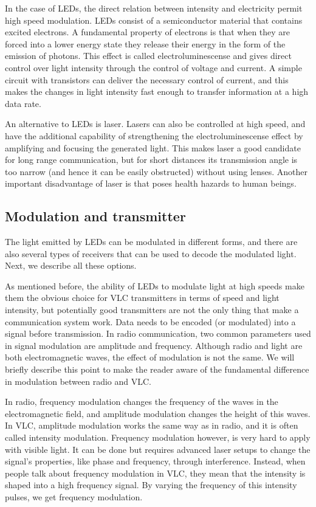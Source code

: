 In the case of LEDs, the direct relation between intensity and electricity permit
high speed modulation. LEDs consist of a semiconductor material that contains
excited electrons. A fundamental property of electrons is that when they are
forced into a lower energy state they release their energy in the form of the emission
of photons. This effect is called electroluminescense and gives direct control
over light intensity through the control of voltage and current. A simple circuit
with transistors can deliver the necessary control of current, and this makes the
changes in light intensity fast enough to transfer information at a high data rate.

An alternative to LEDs is laser. Lasers can also be controlled at high speed, and
have the additional capability of strengthening the electroluminescense effect by
amplifying and focusing the generated light. This makes laser a good candidate
for long range communication, but for short distances its transmission angle is too
narrow (and hence it can be easily obstructed) without using lenses. Another
important disadvantage of laser is that poses health hazards to human beings.

\subsection{Modulation and transmitter}

The light emitted by LEDs can be modulated in different forms, and there are also
several types of receivers that can be used to decode the modulated light. Next,
we describe all these options.

As mentioned before, the ability of LEDs to modulate light at high speeds make
them the obvious choice for VLC transmitters in terms of speed and light intensity,
but potentially good transmitters are not the only thing that make a communication
system work. Data needs to be encoded (or modulated) into a signal before
transmission.
In radio communication, two common parameters used in signal modulation
are amplitude and frequency. Although radio and light are both electromagnetic
waves, the effect of modulation is not the same. We will briefly describe this point
to make the reader aware of the fundamental difference in modulation between
radio and VLC.

In radio, frequency modulation changes the frequency of the waves in the electromagnetic
field, and amplitude modulation changes the height of this waves.
In VLC, amplitude modulation works the same way as in radio, and it is often
called intensity modulation. Frequency modulation however, is very hard to apply
with visible light. It can be done but requires advanced laser setups to change
the signal’s properties, like phase and frequency, through interference. Instead,
when people talk about frequency modulation in VLC, they mean that the intensity
is shaped into a high frequency signal. By varying the frequency of this intensity
pulses, we get frequency modulation.

